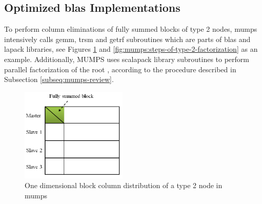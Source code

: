 \subsection{Optimized \acrshort{blas} Implementations}
\label{subseq:blas-comparison}


To perform column eliminations of fully summed blocks of type 2 nodes, \acrshort{mumps} intensively calls \acrshort{gemm}, \acrshort{trsm} and \acrshort{getrf} subroutines  \cite{l2013introduction} which are parts of \acrshort{blas} and \acrshort{lapack} libraries, see Figures \ref{fig:mumps:type-2-frontal-matrix} and  \ref{fig:mumps:steps-of-type-2-factorization} as an example. Additionally, MUMPS uses \acrshort{scalapack} library subroutines to perform parallel factorization of the root \cite{mumps-manual}, according to the procedure described in Subsection \ref{subseq:mumps-review}. \\


\figpointer{\ref{fig:mumps:type-2-frontal-matrix}}
\begin{figure}[htpb]
  \centering
  \includegraphics[width=0.45\textwidth]{figures/chapter-2/mumps-type-2-frontal-matrix.png}
\caption{One dimensional block column distribution of a type 2 node in \acrshort{mumps}}
\label{fig:mumps:type-2-frontal-matrix}
\end{figure}


